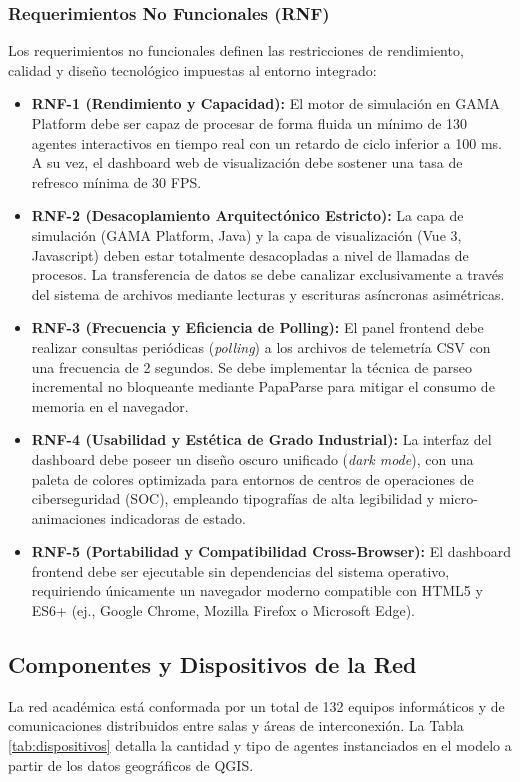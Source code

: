 \subsubsection{Requerimientos No Funcionales (RNF)}
Los requerimientos no funcionales definen las restricciones de rendimiento, calidad y diseño tecnológico impuestas al entorno integrado:
\begin{itemize}
    \item \textbf{RNF-1 (Rendimiento y Capacidad):} El motor de simulación en GAMA Platform debe ser capaz de procesar de forma fluida un mínimo de 130 agentes interactivos en tiempo real con un retardo de ciclo inferior a 100 ms. A su vez, el dashboard web de visualización debe sostener una tasa de refresco mínima de 30 FPS.
    \item \textbf{RNF-2 (Desacoplamiento Arquitectónico Estricto):} La capa de simulación (GAMA Platform, Java) y la capa de visualización (Vue 3, Javascript) deben estar totalmente desacopladas a nivel de llamadas de procesos. La transferencia de datos se debe canalizar exclusivamente a través del sistema de archivos mediante lecturas y escrituras asíncronas asimétricas.
    \item \textbf{RNF-3 (Frecuencia y Eficiencia de Polling):} El panel frontend debe realizar consultas periódicas (\textit{polling}) a los archivos de telemetría CSV con una frecuencia de 2 segundos. Se debe implementar la técnica de parseo incremental no bloqueante mediante PapaParse para mitigar el consumo de memoria en el navegador.
    \item \textbf{RNF-4 (Usabilidad y Estética de Grado Industrial):} La interfaz del dashboard debe poseer un diseño oscuro unificado (\textit{dark mode}), con una paleta de colores optimizada para entornos de centros de operaciones de ciberseguridad (SOC), empleando tipografías de alta legibilidad y micro-animaciones indicadoras de estado.
    \item \textbf{RNF-5 (Portabilidad y Compatibilidad Cross-Browser):} El dashboard frontend debe ser ejecutable sin dependencias del sistema operativo, requiriendo únicamente un navegador moderno compatible con HTML5 y ES6+ (ej., Google Chrome, Mozilla Firefox o Microsoft Edge).
\end{itemize}

\subsection{Componentes y Dispositivos de la Red}
La red académica está conformada por un total de 132 equipos informáticos y de comunicaciones distribuidos entre salas y áreas de interconexión. La Tabla \ref{tab:dispositivos} detalla la cantidad y tipo de agentes instanciados en el modelo a partir de los datos geográficos de QGIS.


